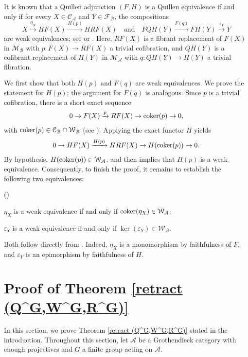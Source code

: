 \documentclass[12pt,twoside]{amsart}
\theoremstyle{bfupright head,slanted body}
\theoremstyle{bfupright head,upright body}
\theoremstyle{fixed bf head,slanted body}
\theoremstyle{fixed bf head,upright body}
\theoremstyle{numbered paragraph}
\newlength{\thmlistleft}        %
\newlength{\thmlistright}       %
\newlength{\thmlistpartopsep}   %
\newlength{\thmlisttopsep}      %
\newlength{\thmlistparsep}      %
\newlength{\thmlistitemsep}     %
\newcounter{rqm}
\newenvironment{rqm}{\begin{list}{\upshape (\arabic{rqm})}%
    {\usecounter{rqm}%
      \setlength{\leftmargin}{\thmlistleft}%
      \setlength{\labelwidth}{\thmlistleft}%
      \setlength{\rightmargin}{\thmlistright}%
      \setlength{\partopsep}{\thmlistpartopsep}%
      \setlength{\topsep}{\thmlisttopsep}%
      \setlength{\parsep}{\thmlistparsep}%
      \setlength{\itemsep}{\thmlistitemsep}}}%
  {\end{list}}%
\newenvironment{prf*}[1][Proof]{%
  \begin{proof}[\bf #1]
    \setcounter{equation}{0}
    \renewcommand{\theequation}{\arabic{equation}}}
  {\end{proof}
}
\newcommand{\thmcite}[2][?]{\cite[Theorem~#1]{#2}}
\newcommand{\prpcite}[2][?]{\cite[Proposition~#1]{#2}}
\newcommand{\lemcite}[2][?]{\cite[Lemma~#1]{#2}}
\numberwithin{equation}{res}
\newcommand{\coker}{\mbox{\rm coker}}
\newcommand{\calC}{\mathcal{C}}
\newcommand{\calW}{\mathcal{W}}
\newcommand{\calF}{\mathcal{F}}
\newcommand{\calA}{\mathcal{A}}
\newcommand{\calB}{\mathcal{B}}
\newcommand{\calM}{\mathcal{M}}
\begin{document}
\begin{prf*}
It is known that a Quillen adjunction \((F,H)\) is a Quillen equivalence if and only if for every \(X\in\calC_\calA\) and \(Y\in\calF_\calB\), the compositions
\[
X \xrightarrow{\eta_X} HF(X) \xrightarrow{H(p)} HRF(X)
\quad\text{and}\quad
FQH(Y) \xrightarrow{F(q)} FH(Y) \xrightarrow{\varepsilon_Y} Y
\]
are weak equivalences; see \thmcite[7.17]{2025GillBook} or \prpcite[1.3.13]{Hovey1999}.
Here, \(RF(X)\) is a fibrant replacement of \(F(X)\) in \(\calM_\calB\) with \(p: F(X) \to RF(X)\) a trivial cofibration, and \(QH(Y)\) is a cofibrant replacement of \(H(Y)\) in \(\calM_\calA\) with \(q: QH(Y) \to H(Y)\) a trivial fibration.

We first show that both \(H(p)\) and \(F(q)\) are weak equivalences.
We prove the statement for \(H(p)\); the argument for \(F(q)\) is analogous.
Since \(p\) is a trivial cofibration, there is a short exact sequence
\[
0 \to F(X) \xrightarrow{p} RF(X) \to \coker(p) \to 0,
\]
with \(\coker(p) \in \calC_\calB \cap \calW_\calB\) (see \prpcite[4.2]{HOVEY2002}).
Applying the exact functor \(H\) yields
\[
0 \to HF(X) \xrightarrow{H(p)} HRF(X) \to H(\coker(p)) \to 0.
\]
By hypothesis, \(H(\coker(p)) \in \calW_\calA\), and \lemcite[5.8]{HOVEY2002} then implies that \(H(p)\) is a weak equivalence.
Consequently, to finish the proof, it remains to establish the following two equivalences:
\begin{rqm}
\item[\(\bullet\)]
\(\eta_X\) is a weak equivalence if and only if \(\coker(\eta_X) \in \calW_\calA\);

\item[\(\bullet\)]
\(\varepsilon_Y\) is a weak equivalence if and only if \(\ker(\varepsilon_Y) \in \calW_\calB\).
\end{rqm}
Both follow directly from \lemcite[5.8]{HOVEY2002}.
Indeed, \(\eta_X\) is a monomorphism by faithfulness of \(F\), and \(\varepsilon_Y\) is an epimorphism by faithfulness of \(H\).
\end{prf*}

\section{Proof of Theorem \ref{retract (Q^G,W^G,R^G)}}
\label{Proofs of Theorems A}%
\noindent
In this section, we prove Theorem \ref{retract (Q^G,W^G,R^G)} stated in the introduction. {\sf Throughout this section}, let $\calA$ be a Grothendieck category with enough projectives and $G$ a finite group acting on $\calA$.
\end{document}
